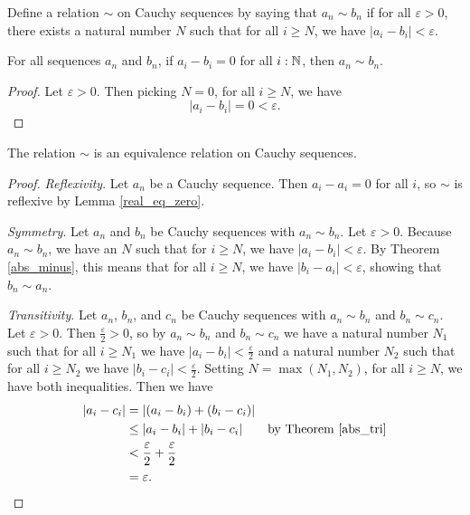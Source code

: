 \documentclass[../../math.tex]{subfiles}
\begin{document}
\begin{definition}
    Define a relation $\sim$ on Cauchy sequences by saying that $a_n \sim b_n$
    if for all $\varepsilon > 0$, there exists a natural number $N$ such that
    for all $i \geq N$, we have $|a_i - b_i| < \varepsilon$.
\end{definition}

\begin{lemma} \label{real_eq_zero}
    For all sequences $a_n$ and $b_n$, if $a_i - b_i = 0$ for all $i : \mathbb{N}$, then
    $a_n \sim b_n$.
\end{lemma}
\begin{proof}
    Let $\varepsilon > 0$.  Then picking $N = 0$, for all $i \geq N$, we have
    \[
        |a_i - b_i| = 0 < \varepsilon.
    \]
\end{proof}

\begin{lemma}
    The relation $\sim$ is an equivalence relation on Cauchy sequences.
\end{lemma}
\begin{proof}
    \textit{Reflexivity}.  Let $a_n$ be a Cauchy sequence.  Then $a_i - a_i = 0$
    for all $i$, so $\sim$ is reflexive by Lemma \ref{real_eq_zero}.

    \textit{Symmetry}.  Let $a_n$ and $b_n$ be Cauchy sequences with $a_n \sim
    b_n$.  Let $\varepsilon > 0$.  Because $a_n \sim b_n$, we have an $N$ such
    that for $i \geq N$, we have $|a_i - b_i| < \varepsilon$.  By Theorem
    \ref{abs_minus}, this means that for all $i \geq N$, we have $|b_i - a_i| <
    \varepsilon$, showing that $b_n \sim a_n$.

    \textit{Transitivity}.  Let $a_n$, $b_n$, and $c_n$ be Cauchy sequences with
    $a_n \sim b_n$ and $b_n \sim c_n$.  Let $\varepsilon > 0$.  Then
    $\frac{\varepsilon}{2} > 0$, so by $a_n \sim b_n$ and $b_n \sim c_n$ we have
    a natural number $N_1$ such that for all $i \geq N_1$ we have $|a_i - b_i| <
    \frac{\varepsilon}{2}$ and a natural number $N_2$ such that for all $i \geq
    N_2$ we have $|b_i - c_i| < \frac{\varepsilon}{2}$.  Setting $N = \max(N_1,
    N_2)$, for all $i \geq N$, we have both inequalities.  Then we have
    \begin{align*}
        |a_i - c_i|
        &= |(a_i - b_i) + (b_i - c_i)| && \\
        &\leq |a_i - b_i| + |b_i - c_i| && \text{by Theorem \ref{abs_tri}} \\
        &< \frac{\varepsilon}{2} + \frac{\varepsilon}{2} && \\
        &= \varepsilon. &&
    \end{align*}
\end{proof}
\end{document}
